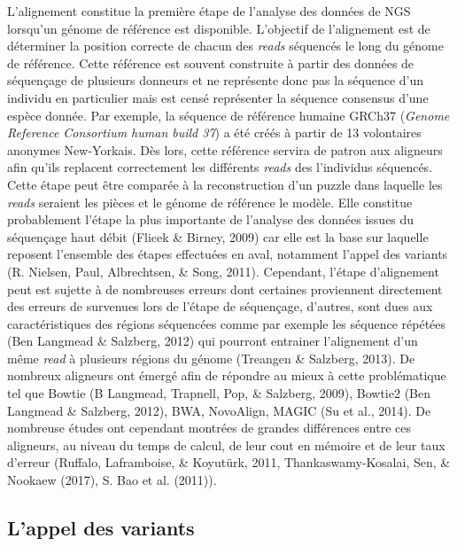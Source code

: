 \documentclass[12pt,twoside]{reedthesis}
\theoremstyle{definition}
\theoremstyle{definition}
\theoremstyle{remark}
\begin{document}
  L'alignement constitue la première étape de l'analyse des données de NGS
  lorsqu'un génome de référence est disponible. L'objectif de l'alignement
  est de déterminer la position correcte de chacun des \emph{reads}
  séquencés le long du génome de référence. Cette référence est souvent
  construite à partir des données de séquençage de plusieurs donneurs et
  ne représente donc pas la séquence d'un individu en particulier mais est
  censé représenter la séquence consensus d'une espèce donnée. Par
  exemple, la séquence de référence humaine GRCh37 (\emph{Genome Reference
  Consortium human build 37}) a été créés à partir de 13 volontaires
  anonymes New-Yorkais. Dès lors, cette référence servira de patron aux
  aligneurs afin qu'ils replacent correctement les différents \emph{reads}
  des l'individus séquencés. Cette étape peut être comparée à la
  reconstruction d'un puzzle dans laquelle les \emph{reads} seraient les
  pièces et le génome de référence le modèle. Elle constitue probablement
  l'étape la plus importante de l'analyse des données issues du séquençage
  haut débit (Flicek \& Birney, 2009) car elle est la base sur laquelle
  reposent l'ensemble des étapes effectuées en aval, notamment l'appel des
  variants (R. Nielsen, Paul, Albrechtsen, \& Song, 2011). Cependant,
  l'étape d'alignement peut est sujette à de nombreuses erreurs dont
  certaines proviennent directement des erreurs de survenues lors de
  l'étape de séquençage, d'autres, sont dues aux caractéristiques des
  régions séquencées comme par exemple les séquence répétées (Ben Langmead
  \& Salzberg, 2012) qui pourront entrainer l'alignement d'un même
  \emph{read} à plusieurs régions du génome (Treangen \& Salzberg, 2013).
  De nombreux aligneurs ont émergé afin de répondre au mieux à cette
  problématique tel que Bowtie (B Langmead, Trapnell, Pop, \& Salzberg,
  2009), Bowtie2 (Ben Langmead \& Salzberg, 2012), BWA, NovoAlign, MAGIC
  (Su et al., 2014). De nombreuse études ont cependant montrées de grandes
  différences entre ces aligneurs, au niveau du temps de calcul, de leur
  cout en mémoire et de leur taux d'erreur (Ruffalo, Laframboise, \&
  Koyutürk, 2011, Thankaswamy-Kosalai, Sen, \& Nookaew (2017), S. Bao et
  al. (2011)).
  
  \subsection{L'appel des variants}\label{lappel-des-variants}
  
\end{document}
